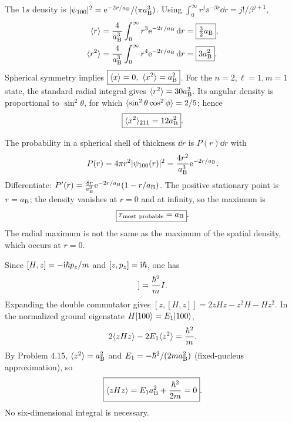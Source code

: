 The $1s$ density is
$|\psi_{100}|^2=\mathrm e^{-2r/a_{\mathrm B}}/(\pi a_{\mathrm B}^3)$.
Using $\int_0^\infty r^j\ee^{-\beta r}\dd r
=j!/\beta^{j+1}$,
\begin{align}
\langle r\rangle&=\frac4{a_{\mathrm B}^3}\int_0^\infty
r^3\mathrm e^{-2r/a_{\mathrm B}}\,\mathrm d r
=\boxed{\tfrac32a_{\mathrm B}},\\
\langle r^2\rangle&=\frac4{a_{\mathrm B}^3}\int_0^\infty
r^4\mathrm e^{-2r/a_{\mathrm B}}\,\mathrm d r
=\boxed{3a_{\mathrm B}^2}.
\end{align}
Spherical symmetry implies
$\boxed{\langle x\rangle=0,\ \langle x^2\rangle=a_{\mathrm B}^2}$.
For the $n=2,\ell=1,m=1$ state,
the standard radial integral gives
$\langle r^2\rangle=30a_{\mathrm B}^2$.
Its angular density is proportional to
$\sin^2\theta$, for which
$\langle \sin^2\theta\cos^2\phi\rangle=2/5$;
hence
\begin{equation}
\boxed{\langle x^2\rangle_{211}=12a_{\mathrm B}^2}.
\end{equation}

The probability in a spherical shell of thickness
$\dd r$ is $P(r)\dd r$ with
\begin{equation}
P(r)=4\pi r^2|\psi_{100}(r)|^2
=\frac{4r^2}{a_{\mathrm B}^3}\mathrm e^{-2r/a_{\mathrm B}}.
\end{equation}
Differentiate:
$P'(r)=\frac{8r}{a_{\mathrm B}^3}\mathrm e^{-2r/a_{\mathrm B}}
(1-r/a_{\mathrm B})$.
The positive stationary point is
$r=a_{\mathrm B}$; the density vanishes at $r=0$
and at infinity, so the maximum is
\begin{equation}
\boxed{r_{\rm most\ probable}=a_{\mathrm B}}.
\end{equation}
The radial maximum is not the same
as the maximum of the spatial density,
which occurs at $r=0$.

Since $[H,z]=-\mathrm i\hbar p_z/m$ and
$[z,p_z]=\mathrm i\hbar$, one has
\begin{equation}
[z,[H,z]]=\frac{\sh^2}{m}I.
\end{equation}
Expanding the double commutator gives
$[z,[H,z]]=2zHz-z^2H-Hz^2$.
In the normalized ground eigenstate
$H\lvert 100\rangle=E_1\lvert 100\rangle$,
\begin{equation}
2\langle zHz\rangle-2E_1\langle z^2\rangle
=\frac{\hbar^2}{m}.
\end{equation}
By Problem 4.15, $\langle z^2\rangle=a_{\mathrm B}^2$ and
$E_1=-\hbar^2/(2ma_{\mathrm B}^2)$
(fixed-nucleus approximation), so
\begin{equation}
\boxed{\langle zHz\rangle=E_1a_{\mathrm B}^2+\frac{\hbar^2}{2m}=0}.
\end{equation}
No six-dimensional integral is necessary.

